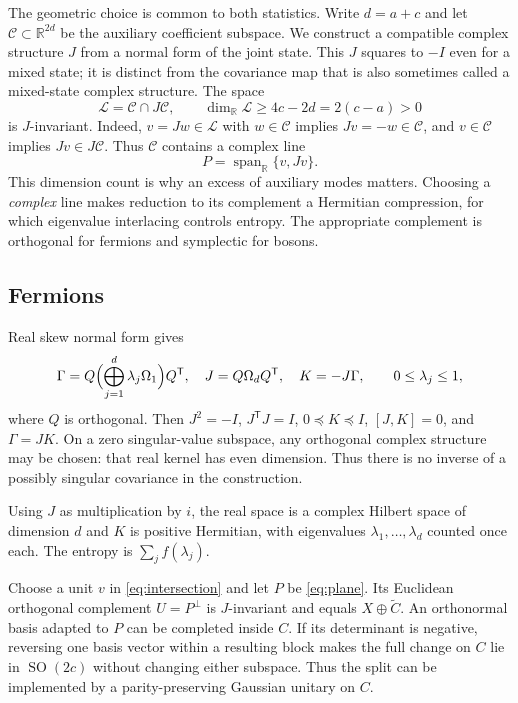 \documentclass[11pt,a4paper]{article}
\numberwithin{equation}{section}
\theoremstyle{remark}
\newcommand{\R}{\mathbb R}
\newcommand{\T}{\mathsf T}
\newcommand{\SO}{\operatorname{SO}}
\newcommand{\Span}{\operatorname{span}}
\begin{document}
The geometric choice is common to both statistics. Write $d=a+c$ and let $\mathcal C\subset\R^{2d}$ be the auxiliary coefficient subspace. We construct a compatible complex structure $J$ from a normal form of the joint state. This $J$ squares to $-I$ even for a mixed state; it is distinct from the covariance map that is also sometimes called a mixed-state complex structure. The space
\begin{equation}\label{eq:intersection}
 \mathcal L=\mathcal C\cap J\mathcal C,
 \qquad \dim_{\R}\mathcal L\ge4c-2d=2(c-a)>0
\end{equation}
is $J$-invariant. Indeed, $v=Jw\in\mathcal L$ with $w\in\mathcal C$ implies $Jv=-w\in\mathcal C$, and $v\in\mathcal C$ implies $Jv\in J\mathcal C$. Thus $\mathcal C$ contains a complex line
\begin{equation}\label{eq:plane}
 P=\Span_{\R}\{v,Jv\}.
\end{equation}
This dimension count is why an excess of auxiliary modes matters. Choosing a \emph{complex} line makes reduction to its complement a Hermitian compression, for which eigenvalue interlacing controls entropy. The appropriate complement is orthogonal for fermions and symplectic for bosons.

\subsection{Fermions}
Real skew normal form gives
\begin{equation}\label{eq:fermion-jk}
 \Gamma=Q\Bigl(\bigoplus_{j=1}^d\lambda_j\Omega_1\Bigr)Q^{\T},\quad
 J=Q\Omega_dQ^{\T},\quad K=-J\Gamma,
 \qquad 0\le\lambda_j\le1,
\end{equation}
where $Q$ is orthogonal. Then $J^2=-I$, $J^{\T}J=I$, $0\preceq K\preceq I$, $[J,K]=0$, and $\Gamma=JK$. On a zero singular-value subspace, any orthogonal complex structure may be chosen: that real kernel has even dimension. Thus there is no inverse of a possibly singular covariance in the construction.

Using $J$ as multiplication by $i$, the real space is a complex Hilbert space of dimension $d$ and $K$ is positive Hermitian, with eigenvalues $\lambda_1,\ldots,\lambda_d$ counted once each. The entropy is $\sum_j f(\lambda_j)$.

Choose a unit $v$ in \eqref{eq:intersection} and let $P$ be \eqref{eq:plane}. Its Euclidean orthogonal complement $U=P^\perp$ is $J$-invariant and equals $X\oplus\widetilde C$. An orthonormal basis adapted to $P$ can be completed inside $C$. If its determinant is negative, reversing one basis vector within a resulting block makes the full change on $C$ lie in $\SO(2c)$ without changing either subspace. Thus the split can be implemented by a parity-preserving Gaussian unitary on $C$.
\end{document}
